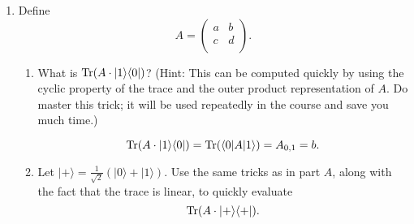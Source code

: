 \documentclass{article}
\newcommand{\bra}[1]{\langle #1|}
\newcommand{\ket}[1]{|#1\rangle}
\newcommand{\braket}[2]{\langle #1|#2\rangle}
\newcommand{\ketbra}[2]{\ket{#1}{\bra{#2}}}
\newcommand{\trace}{{\rm Tr}}
\begin{document}
\begin{enumerate}
\begin{proof}
\begin{equation}
\begin{aligned}
                                            & =\sqrt{\braket{\psi}{\psi}-\braket{\psi}{\phi}-\braket{\phi}{\psi}+\braket{\phi}{\phi}}                        \\
                                            & =\sqrt{1-\braket{\psi}{\phi}-\braket{\phi}{\psi}+1}=\sqrt{2-\braket{\psi}{\phi}-\braket{\psi}{\phi}^\ast}      \\
                                            & =\sqrt{2-(\braket{\psi}{\phi}+\braket{\psi}{\phi}^\ast)}=\sqrt{2-2\cdot\operatorname{Re}(\braket{\psi}{\phi})} \\
            \end{aligned}
          \end{equation}
        \end{proof}
        Why does it not matter if we replace $\braket{\psi}{\phi}$ with $\braket{\phi}{\psi}$ in this equation?

        It does not matter, since $\braket{\psi}{\phi}=\braket{\phi}{\psi}^\ast$, and this implies that $\operatorname{Re}(\braket{\psi}{\phi})=\operatorname{Re}(\braket{\phi}{\psi})$.
  \item %
        Define
        \[
          A=\left(
          \begin{array}{cc}
              a & b \\
              c & d \\
            \end{array}
          \right).
        \]
        \begin{enumerate}
          \item %
                What is $\trace(A\cdot \ketbra{1}{0})$? (Hint: This can be computed quickly by using the cyclic property of the trace and the outer product representation of $A$. Do master this trick; it will be used repeatedly in the course and save you much time.)

                \begin{equation}
                  \trace(A\cdot \ketbra{1}{0})=\trace(\bra{0}A\ket{1})=A_{0,1}=b.
                \end{equation}
          \item %
                Let $\ket{+}=\frac{1}{\sqrt{2}}(\ket{0}+\ket{1})$. Use the same tricks as in part $A$, along with the fact that the trace is linear, to quickly evaluate
                \[
                  \trace(A\cdot\ketbra{+}{+}).
                \]


\end{enumerate}
\end{enumerate}
\end{document}
